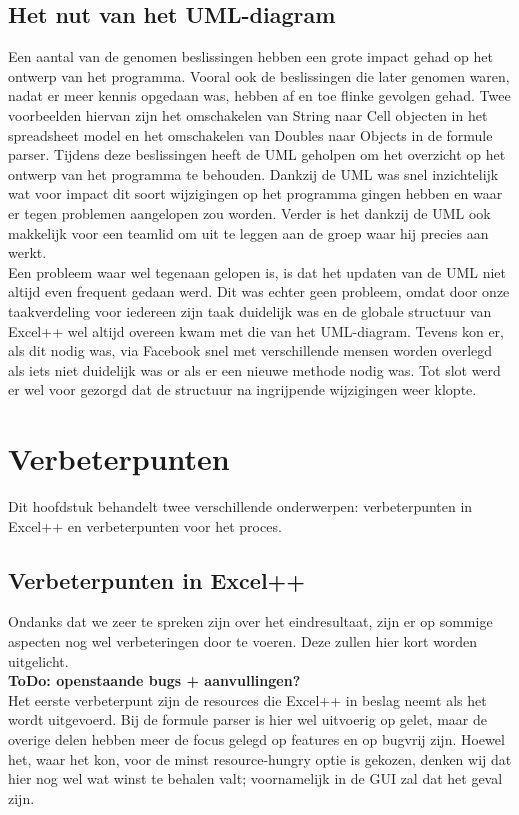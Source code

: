 \documentclass[a4paper,11pt]{article}
\begin{document}
\subsection{Het nut van het UML-diagram}
Een aantal van de genomen beslissingen hebben een grote impact gehad op het ontwerp van het programma. Vooral ook de beslissingen die later genomen waren, nadat er meer kennis opgedaan was, hebben af en toe flinke gevolgen gehad. Twee voorbeelden hiervan zijn het omschakelen van String naar Cell objecten in het spreadsheet model en het omschakelen van Doubles naar Objects in de formule parser. Tijdens deze beslissingen heeft de UML geholpen om het overzicht op het ontwerp van het programma te behouden. Dankzij de UML was snel inzichtelijk wat voor impact dit soort wijzigingen op het programma gingen hebben en waar er tegen problemen aangelopen zou worden. Verder is het dankzij de UML ook makkelijk voor een teamlid om uit te leggen aan de groep waar hij precies aan werkt.\\

Een probleem waar wel tegenaan gelopen is, is dat het updaten van de UML niet altijd even frequent gedaan werd. Dit was echter geen probleem, omdat door onze taakverdeling voor iedereen zijn taak duidelijk was en de globale structuur van Excel++ wel altijd overeen kwam met die van het UML-diagram. Tevens kon er, als dit nodig was, via Facebook snel met verschillende mensen worden overlegd als iets niet duidelijk was or als er een nieuwe methode nodig was. Tot slot werd er wel voor gezorgd dat de structuur na ingrijpende wijzigingen weer klopte.

\newpage\section{Verbeterpunten}
Dit hoofdstuk behandelt twee verschillende onderwerpen: verbeterpunten in Excel++ en verbeterpunten voor het proces.\\

\subsection{Verbeterpunten in Excel++}
Ondanks dat we zeer te spreken zijn over het eindresultaat, zijn er op sommige aspecten nog wel verbeteringen door te voeren. Deze zullen hier kort worden uitgelicht.\\

\textbf{ToDo: openstaande bugs + aanvullingen?}\\
Het eerste verbeterpunt zijn de resources die Excel++ in beslag neemt als het wordt uitgevoerd. Bij de formule parser is hier wel uitvoerig op gelet, maar de overige delen hebben meer de focus gelegd op features en op bugvrij zijn. Hoewel het, waar het kon, voor de minst resource-hungry optie is gekozen, denken wij dat hier nog wel wat winst te behalen valt; voornamelijk in de GUI zal dat het geval zijn.\\
\end{document}
